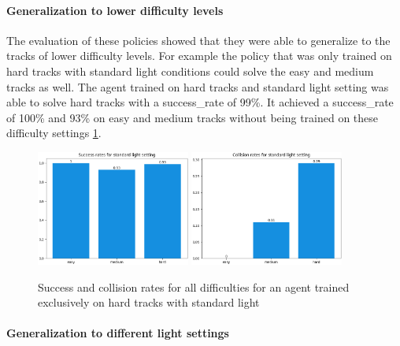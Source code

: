 \paragraph{Generalization to lower difficulty levels} 
The evaluation of these policies showed that they were able to generalize to the tracks of lower difficulty levels. For example the policy that was only trained on hard tracks with standard light conditions could solve the easy and medium tracks as well. The agent trained on hard tracks and standard light setting was able to solve hard tracks with a success\_rate of 99\%. It achieved a success\_rate of 100\% and 93\% on easy and medium tracks without being trained on these difficulty settings \ref{fig:hardDistance_generalization}.

\begin{figure}
    \centering
    \includegraphics[width=0.45\textwidth]{Bilder/notebook_images/hardDistanceStandardLight_eval_standard_success_rates_barplot.png}
    \includegraphics[width=0.45\textwidth]{Bilder/notebook_images/hardDistanceStandardLight_eval_standard_collision_rates_barplot.png}
    \caption{Success and collision rates for all difficulties for an agent trained exclusively on hard tracks with standard light}
    \label{fig:hardDistance_generalization}
\end{figure}

\paragraph{Generalization to different light settings}
\label{cha:experiment_fixed_difficulty_light_settings}

